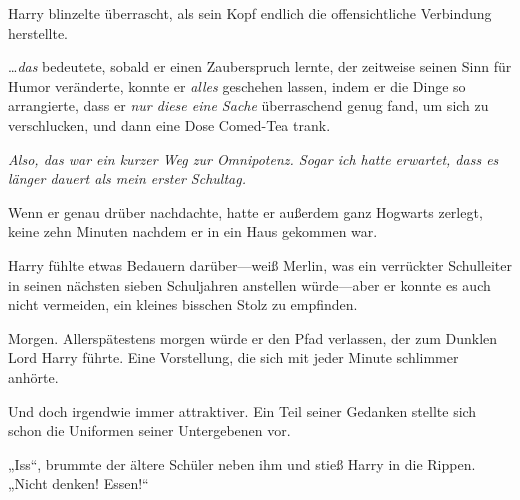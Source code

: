 Harry blinzelte überrascht, als sein Kopf endlich die offensichtliche Verbindung herstellte.

…\emph{das} bedeutete, sobald er einen Zauberspruch lernte, der zeitweise seinen Sinn für Humor veränderte, konnte er \emph{alles} geschehen lassen, indem er die Dinge so arrangierte, dass er \emph{nur diese eine Sache} überraschend genug fand, um sich zu verschlucken, und dann eine Dose Comed-Tea trank.

\emph{Also, das war ein kurzer Weg zur Omnipotenz. Sogar ich hatte erwartet, dass es länger dauert als mein erster Schultag.}

Wenn er genau drüber nachdachte, hatte er außerdem ganz Hogwarts zerlegt, keine zehn Minuten nachdem er in ein Haus gekommen war.

Harry fühlte etwas Bedauern darüber—weiß Merlin, was ein verrückter Schulleiter in seinen nächsten sieben Schuljahren anstellen würde—aber er konnte es auch nicht vermeiden, ein kleines bisschen Stolz zu empfinden.

Morgen. Allerspätestens morgen würde er den Pfad verlassen, der zum Dunklen Lord Harry führte. Eine Vorstellung, die sich mit jeder Minute schlimmer anhörte.

Und doch irgendwie immer attraktiver. Ein Teil seiner Gedanken stellte sich schon die Uniformen seiner Untergebenen vor.

„Iss“, brummte der ältere Schüler neben ihm und stieß Harry in die Rippen. „Nicht denken! Essen!“

